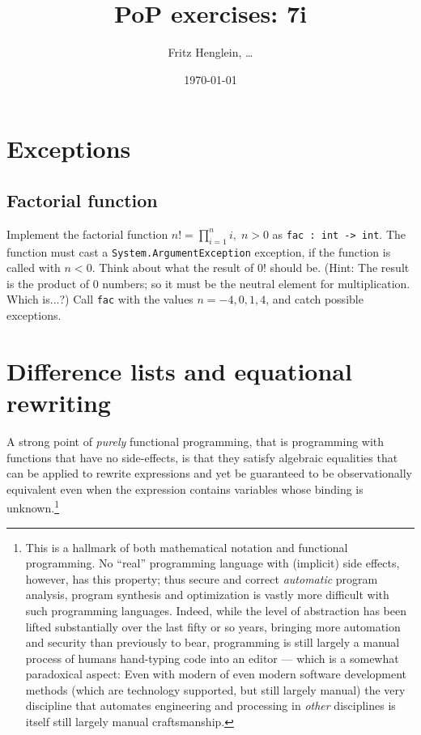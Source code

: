 \documentclass[a4paper,11pt]{article}
\title{PoP exercises: 7i}
\date\today
\author{Fritz Henglein, \ldots}
\begin{document}
\maketitle

\section{Exceptions}

\subsection{Factorial function}

\label{fac1} Implement the factorial function $n! = \prod_{i=1}^ni,\; n >0$ as \lstinline{fac : int -> int}. The function must cast a \lstinline{System.ArgumentException} exception, if the function is called with $n < 0$.  Think about what the result of $0!$ should be.  (Hint: The result is the product of $0$ numbers; so it must be the neutral element for multiplication.  Which is...?) Call \lstinline{fac} with the values $n=-4,0,1,4$, and catch possible exceptions.

\section{Difference lists and equational rewriting}

A strong point of \emph{purely} functional programming, that is programming with functions that have no side-effects, is that they satisfy algebraic equalities that can be applied to rewrite expressions and yet be guaranteed to be observationally equivalent even when the expression contains variables whose binding is unknown.\footnote{This is a hallmark of both mathematical notation and functional programming. No ``real'' programming language with (implicit) side effects, however, has this property; thus secure and correct \emph{automatic} program analysis, program synthesis and optimization is vastly more difficult with such programming languages.  Indeed, while the level of abstraction has been lifted substantially over the last fifty or so years, bringing more automation and security than previously to bear, programming is still largely a manual process of humans hand-typing code into an editor --- which is a somewhat paradoxical aspect:  Even with modern of even modern software development methods (which are technology supported, but still largely manual) the very discipline that automates engineering and processing in \emph{other} disciplines is itself still largely manual craftsmanship.}
\end{document}

